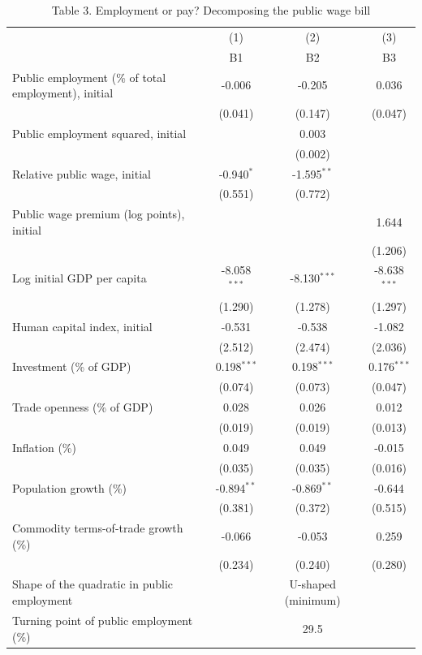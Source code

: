 \begin{table}[htbp]\centering\footnotesize
\providecommand{\sym}[1]{\ensuremath{^{#1}}}
\caption{Table 3. Employment or pay? Decomposing the public wage bill}\label{tab:Table3_decomposition}
\begin{tabular}{l*{3}{c}}
\toprule
 & (1) & (2) & (3) \\
 & B1 & B2 & B3 \\
\midrule
Public employment (\% of total employment), initial & -0.006 & -0.205 & 0.036 \\
 & (0.041) & (0.147) & (0.047) \\
Public employment squared, initial &  & 0.003 &  \\
 &  & (0.002) &  \\
Relative public wage, initial & -0.940\sym{*} & -1.595\sym{**} &  \\
 & (0.551) & (0.772) &  \\
Public wage premium (log points), initial &  &  & 1.644 \\
 &  &  & (1.206) \\
Log initial GDP per capita & -8.058\sym{***} & -8.130\sym{***} & -8.638\sym{***} \\
 & (1.290) & (1.278) & (1.297) \\
Human capital index, initial & -0.531 & -0.538 & -1.082 \\
 & (2.512) & (2.474) & (2.036) \\
Investment (\% of GDP) & 0.198\sym{***} & 0.198\sym{***} & 0.176\sym{***} \\
 & (0.074) & (0.073) & (0.047) \\
Trade openness (\% of GDP) & 0.028 & 0.026 & 0.012 \\
 & (0.019) & (0.019) & (0.013) \\
Inflation (\%) & 0.049 & 0.049 & -0.015 \\
 & (0.035) & (0.035) & (0.016) \\
Population growth (\%) & -0.894\sym{**} & -0.869\sym{**} & -0.644 \\
 & (0.381) & (0.372) & (0.515) \\
Commodity terms-of-trade growth (\%) & -0.066 & -0.053 & 0.259 \\
 & (0.234) & (0.240) & (0.280) \\
\midrule
Shape of the quadratic in public employment &  & U-shaped (minimum) &  \\
Turning point of public employment (\%) &  & 29.5 &  \\

\end{tabular}
\end{table}
